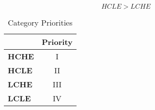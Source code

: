 \begin{definition}
\[\textrm{$HCLE > LCHE$} \]
 
\begin{table}[h]
\caption{Category Priorities} %
\captionsetup{justification=centering}
\centering
\begin{tabular}{l|c|}
\cline{2-2}
                                          & \multicolumn{1}{l|}{\textbf{Priority}} \\ \hline
\multicolumn{1}{|l|}{\textbf{HCHE}}  & I                                      \\ \hline
\multicolumn{1}{|l|}{\textbf{HCLE}}  & II                                     \\ \hline
\multicolumn{1}{|l|}{\textbf{LCHE}} & III                                     \\ \hline
\multicolumn{1}{|l|}{\textbf{LCLE}} & IV                                      \\ \hline
\end{tabular}

\label{tbl:priority} %

\end{table} 

\end{definition}




